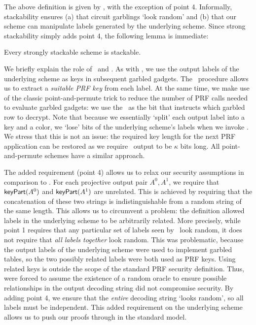 The above definition is given by \HK, with the exception of point 4.
Informally, stackability ensures (a) that circuit garblings `look
random' and (b) that our scheme can manipulate labels generated by the
underlying scheme.
Since strong stackability simply adds point 4, the following lemma is
immediate:
\begin{lemma}\label{lemma:stack-strongstack}
  Every strongly stackable scheme is stackable.
\end{lemma}

We briefly explain the role of \lcolor\ and \lkey. As with \HK, we
use the output labels of the underlying scheme as keys in subsequent
garbled gadgets.  The \lkey\ procedure allows us to extract a
\emph{suitable PRF key} from each label. At the same time, we make use
of the classic point-and-permute trick to reduce the number of PRF calls
needed to evaluate garbled gadgets: we use the \lcolor\ as the bit
that instructs which garbled row to decrypt.  Note that because we
essentially `split’ each output label into a key and a color, we
`lose’ bits of the underlying scheme’s labels when we invoke
\lkey. We stress that this is not an issue: the required key
length for the next PRF application can be restored as we require
\lkey\ output to be $\kappa$ bits long. All point-and-permute schemes
have a similar approach.

The added requirement (point 4) allows us to relax
our security assumptions in comparison to \HK. For
each projective output pair $A^0, A^1$, we require that $\textsf{keyPart}(A^0)$ and
$\textsf{keyPart}(A^1)$ are unrelated.
This is achieved by requiring that the concatenation of these two
strings is indistinguishable from a random string of the same length.
This allows us to circumvent a problem: the \HK definition allowed labels in the underlying
scheme to be arbitrarily related.
More precisely, while point 1 requires that any particular set of labels seen by
\E\ look random, it does not require that \emph{all labels together}
look random.
%
This was problematic, because the output labels of the
underlying scheme were used to implement garbled tables, so
the two possibly related labels were both used as PRF keys.
%
Using related keys is outside the scope of the standard
PRF security definition.
%
Thus, \HK were forced to assume the existence of a random oracle
to ensure possible relationships in the output decoding string
did not compromise security.
%
By adding point 4, we ensure that the \emph{entire} decoding
string `looks random', so all labels must be independent.
This added requirement on the underlying scheme allows us to push our
proofs through in the standard model.


